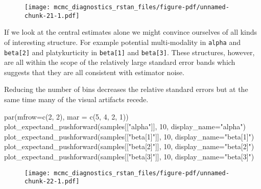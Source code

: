 \documentclass[
  letterpaper,
  DIV=11,
  numbers=noendperiod]{scrartcl}
\newenvironment{Shaded}{\begin{snugshade}}{\end{snugshade}}
\newcommand{\AttributeTok}[1]{\textcolor[rgb]{0.40,0.45,0.13}{#1}}
\newcommand{\DecValTok}[1]{\textcolor[rgb]{0.68,0.00,0.00}{#1}}
\newcommand{\FunctionTok}[1]{\textcolor[rgb]{0.28,0.35,0.67}{#1}}
\newcommand{\NormalTok}[1]{\textcolor[rgb]{0.00,0.23,0.31}{#1}}
\newcommand{\StringTok}[1]{\textcolor[rgb]{0.13,0.47,0.30}{#1}}
\begin{document}
\begin{figure}[H]

{\centering \texttt{[image: mcmc\_diagnostics\_rstan\_files/figure-pdf/unnamed-chunk-21-1.pdf]}

}

\end{figure}

If we look at the central estimates alone we might convince ourselves of
all kinds of interesting structure. For example potential multi-modality
in \texttt{alpha} and \texttt{beta{[}2{]}} and platykurticity in
\texttt{beta{[}1{]}} and \texttt{beta{[}3{]}}. These structures,
however, are all within the scope of the relatively large standard error
bands which suggests that they are all consistent with estimator noise.

Reducing the number of bins decreases the relative standard errors but
at the same time many of the visual artifacts recede.

\begin{Shaded}
\begin{Highlighting}[]
\FunctionTok{par}\NormalTok{(}\AttributeTok{mfrow=}\FunctionTok{c}\NormalTok{(}\DecValTok{2}\NormalTok{, }\DecValTok{2}\NormalTok{), }\AttributeTok{mar =} \FunctionTok{c}\NormalTok{(}\DecValTok{5}\NormalTok{, }\DecValTok{4}\NormalTok{, }\DecValTok{2}\NormalTok{, }\DecValTok{1}\NormalTok{))}
\FunctionTok{plot\_expectand\_pushforward}\NormalTok{(samples[[}\StringTok{"alpha"}\NormalTok{]], }\DecValTok{10}\NormalTok{, }
                           \AttributeTok{display\_name=}\StringTok{"alpha"}\NormalTok{)}
\FunctionTok{plot\_expectand\_pushforward}\NormalTok{(samples[[}\StringTok{"beta[1]"}\NormalTok{]], }\DecValTok{10}\NormalTok{, }
                           \AttributeTok{display\_name=}\StringTok{"beta[1]"}\NormalTok{)}
\FunctionTok{plot\_expectand\_pushforward}\NormalTok{(samples[[}\StringTok{"beta[2]"}\NormalTok{]], }\DecValTok{10}\NormalTok{, }
                           \AttributeTok{display\_name=}\StringTok{"beta[2]"}\NormalTok{)}
\FunctionTok{plot\_expectand\_pushforward}\NormalTok{(samples[[}\StringTok{"beta[3]"}\NormalTok{]], }\DecValTok{10}\NormalTok{, }
                           \AttributeTok{display\_name=}\StringTok{"beta[3]"}\NormalTok{)}
\end{Highlighting}
\end{Shaded}

\begin{figure}[H]

{\centering \texttt{[image: mcmc\_diagnostics\_rstan\_files/figure-pdf/unnamed-chunk-22-1.pdf]}

}

\end{figure}
\end{document}
